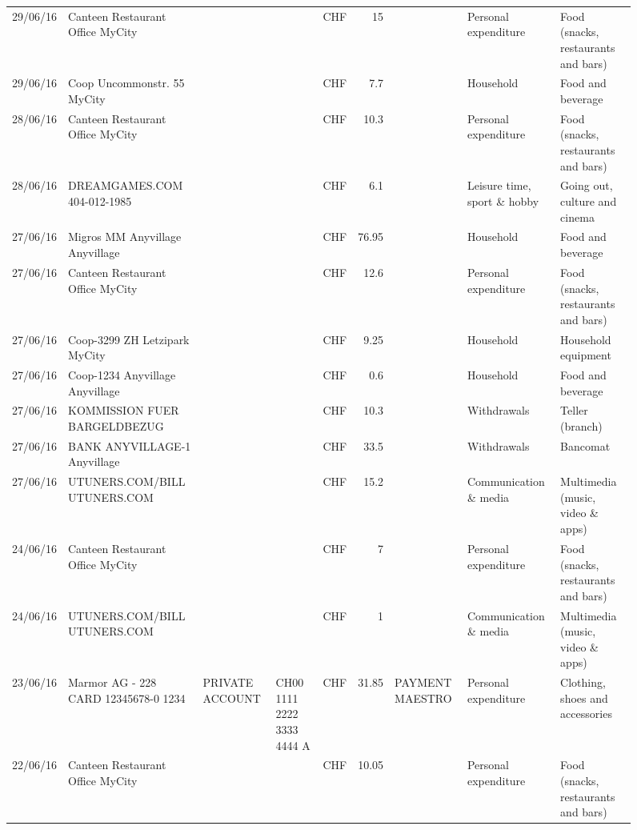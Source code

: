 \begin{landscape}
\begin{sidewaysfigure}
\begin{table}[h]
\begin{center}
\begin{tabular}{rllllrlll}
		29/06/16 & Canteen Restaurant Office      MyCity &       &       & CHF   & 15    &       & Personal expenditure & Food (snacks, restaurants and bars) \\
		29/06/16 & Coop Uncommonstr. 55   MyCity &       &       & CHF   & 7.7   &       & Household & Food and beverage \\
		28/06/16 & Canteen Restaurant Office      MyCity &       &       & CHF   & 10.3  &       & Personal expenditure & Food (snacks, restaurants and bars) \\
		28/06/16 & DREAMGAMES.COM           404-012-1985 &       &       & CHF   & 6.1   &       & Leisure time, sport \& hobby & Going out, culture and cinema \\
		27/06/16 & Migros MM Anyvillage    Anyvillage &       &       & CHF   & 76.95 &       & Household & Food and beverage \\
		27/06/16 & Canteen Restaurant Office      MyCity &       &       & CHF   & 12.6  &       & Personal expenditure & Food (snacks, restaurants and bars) \\
		27/06/16 & Coop-3299 ZH Letzipark   MyCity &       &       & CHF   & 9.25  &       & Household & Household equipment \\
		27/06/16 & Coop-1234 Anyvillage    Anyvillage &       &       & CHF   & 0.6   &       & Household & Food and beverage \\
		27/06/16 & KOMMISSION FUER BARGELDBEZUG &       &       & CHF   & 10.3  &       & Withdrawals & Teller (branch) \\
		27/06/16 & BANK ANYVILLAGE-1        Anyvillage &       &       & CHF   & 33.5  &       & Withdrawals & Bancomat \\
		27/06/16 & UTUNERS.COM/BILL          UTUNERS.COM &       &       & CHF   & 15.2  &       & Communication \& media & Multimedia (music, video \& apps) \\
		24/06/16 & Canteen Restaurant Office      MyCity &       &       & CHF   & 7     &       & Personal expenditure & Food (snacks, restaurants and bars) \\
		24/06/16 & UTUNERS.COM/BILL          UTUNERS.COM &       &       & CHF   & 1     &       & Communication \& media & Multimedia (music, video \& apps) \\
		23/06/16 & Marmor AG - 228 CARD 12345678-0 1234 & PRIVATE ACCOUNT & CH00 1111 2222 3333 4444 A & CHF   & 31.85 & PAYMENT MAESTRO & Personal expenditure & Clothing, shoes and accessories \\
		22/06/16 & Canteen Restaurant Office      MyCity &       &       & CHF   & 10.05 &       & Personal expenditure & Food (snacks, restaurants and bars) \\

\end{tabular}
\end{center}
\end{table}
\end{sidewaysfigure}
\end{landscape}
